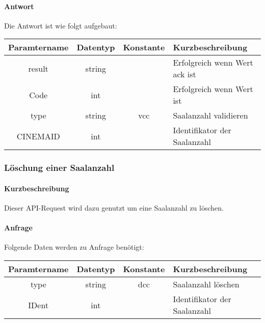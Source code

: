 \paragraph{Antwort}Die Antwort ist wie folgt aufgebaut:
\begin{table}[H]
	\begin{tabular}{|c|c|c|p{6.5cm}|}
		\hline
		\textbf{Paramtername} & \textbf{Datentyp} & \textbf{Konstante} & \textbf{Kurzbeschreibung}                                                                                               \\ \hline
		result              & string           &                 & Erfolgreich wenn Wert {\glqq ack\grqq} ist \\ \hline
		Code                & int              &                 & Erfolgreich wenn Wert {\glqq 0\grqq} ist \\ \hline
		type                & string           & vcc             & Saalanzahl validieren \\ \hline
		CINEMAID            & int              &                 & Identifikator der Saalanzahl \\ \hline
	\end{tabular}
\end{table}
\subsubsection{Löschung einer Saalanzahl}
\paragraph{Kurzbeschreibung}Dieser API-Request wird dazu genutzt um eine Saalanzahl zu löschen.
\paragraph{Anfrage}Folgende Daten werden zu Anfrage benötigt:
\begin{table}[H]
	\begin{tabular}{|c|c|c|p{6.5cm}|}
		\hline
		\textbf{Paramtername} & \textbf{Datentyp} & \textbf{Konstante} & \textbf{Kurzbeschreibung}                                                                                               \\ \hline
		type                & string            & dcc                & Saalanzahl löschen \\ \hline
		IDent               & int               &                    & Identifikator der Saalanzahl \\ \hline
	\end{tabular}
\end{table}

